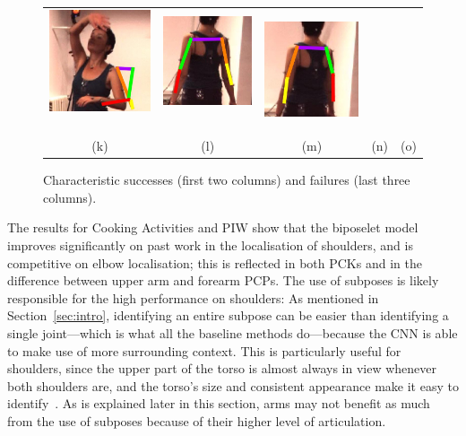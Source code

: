 \documentclass[runningheads]{llncs}
\begin{document}
\begin{figure}[t]
\begin{center}
\begin{tabular}{@{}c@{}c c@{}c@{}c@{}}
\includegraphics[width=0.17\linewidth]{figures/shots-cropped/h36m-s7f8-bad-extreme-articulation.jpg}\,&
\includegraphics[width=0.17\linewidth]{figures/shots-cropped/h36m-s24f12-bad-flip-1.jpg}\,&
\includegraphics[width=0.17\linewidth]{figures/shots-cropped/h36m-s24f14-bad-flip-2.jpg}\\
(k) & (l) & (m) & (n) & (o)
\end{tabular}
\end{center}
\vspace{-6mm}
\caption{Characteristic successes (first two columns) and failures (last three
columns).}
\label{fig:qualitative}
\end{figure}

The results for Cooking Activities and PIW show that the biposelet model
improves significantly on past work in the localisation of shoulders, and is
competitive on elbow localisation; this is reflected in both PCKs and in the
difference between upper arm and forearm PCPs. The use of subposes is likely
responsible for the high performance on shoulders: As mentioned in
Section~\ref{sec:intro}, identifying an entire subpose can be easier than
identifying a single joint---which is what all the baseline methods do---because
the CNN is able to make use of more surrounding context. This is particularly
useful for shoulders, since the upper part of the torso is almost always in view
whenever both shoulders are, and the torso's size and consistent appearance make
it easy to identify~\cite{mori2004recovering}. As is explained later in this
section, arms may not benefit as much from the use of subposes because of their
higher level of articulation.
\end{document}
